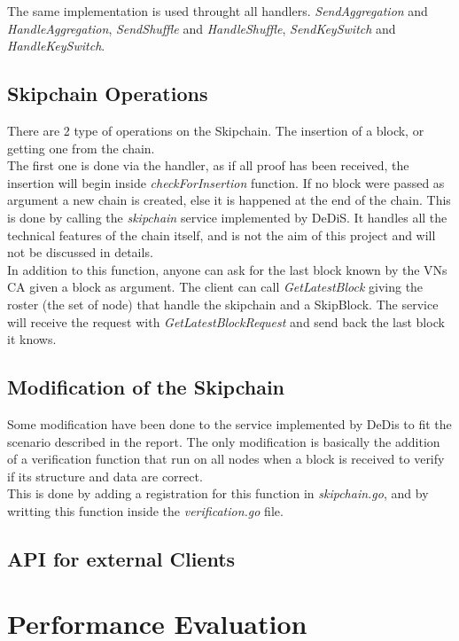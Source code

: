 \documentclass{article}
\begin{document}
The same implementation is used throught all handlers. \textit{SendAggregation} and \textit{HandleAggregation}, \textit{SendShuffle} and \textit{HandleShuffle}, \textit{SendKeySwitch} and \textit{HandleKeySwitch}.

\subsection{Skipchain Operations}
There are 2 type of operations on the Skipchain. The insertion of a block, or getting one from the chain.\\
The first one is done via the handler, as if all proof has been received, the insertion will begin inside \textit{checkForInsertion} function. If no block were passed as argument a new chain is created, else it is happened at the end of the chain. This is done by calling the \textit{skipchain} service implemented by DeDiS. It handles all the technical features of the chain itself, and is not the aim of this project and will not be discussed in details.\\
In addition to this function, anyone can ask for the last block known by the VNs CA given a block as argument. The client can call \textit{GetLatestBlock} giving the roster (the set of node) that handle the skipchain and a SkipBlock. The service will  receive the request with \textit{GetLatestBlockRequest} and send back the last block it knows. 

\subsection{Modification of the Skipchain}
Some modification have been done to the service implemented by DeDis to fit the scenario described in the report. The only  modification is basically the addition of a  verification function that run on all nodes when a block is received to verify if its structure and data are correct.\\
This is done by adding a registration for this function in \textit{skipchain.go}, and by writting this function inside the \textit{verification.go} file.

\subsection{API for external Clients}


\section{Performance Evaluation}
\end{document}
